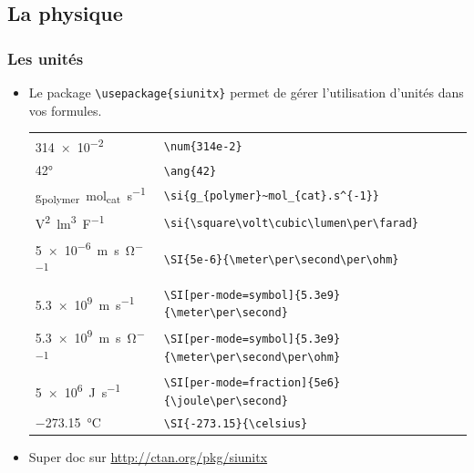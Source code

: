 \subsection{La physique}

\begin{frame}[fragile]
  \frametitle{Les unités}
  \begin{itemize}
    \item Le package \lstinline|\usepackage{siunitx}| permet de gérer l'utilisation d'unités dans vos formules.
        \begin{center}
          \begin{tabular}{ll}
            \num{314e-2} & \lstinline|\num{314e-2}|\\
            \ang{42} & \lstinline|\ang{42}|\\
            \si{g_{polymer}~mol_{cat}.s^{-1}} &
            \lstinline|\si{g_{polymer}~mol_{cat}.s^{-1}}|\\
            \si{\square\volt\cubic\lumen\per\farad} &
            \lstinline|\si{\square\volt\cubic\lumen\per\farad}|\\
            \SI{5e-6}{\meter\per\second\per\ohm} &
            \lstinline|\SI{5e-6}{\meter\per\second\per\ohm}|\\
            \SI[per-mode=symbol]{5.3e9}{\meter\per\second} &
            \lstinline|\SI[per-mode=symbol]{5.3e9}{\meter\per\second}|\\
            \SI[per-mode=symbol]{5.3e9}{\meter\per\second\per\ohm} &
            \lstinline|\SI[per-mode=symbol]{5.3e9}{\meter\per\second\per\ohm}|\\
            \SI[per-mode=fraction]{5e6}{\joule\per\second} &
            \lstinline|\SI[per-mode=fraction]{5e6}{\joule\per\second}|\\
            \SI{-273.15}{\celsius} &
            \lstinline|\SI{-273.15}{\celsius}|
          \end{tabular}
        \end{center}
    \item Super doc sur \url{http://ctan.org/pkg/siunitx}
  \end{itemize}
\end{frame}

